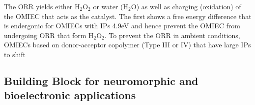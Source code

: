 The ORR yields either H$_{2}$O$_{2}$ or water (H$_{2}$O) as well as charging (oxidation) of the OMIEC that acts as the catalyst. The first shows a free energy difference that is endergonic for OMIECs with IPs \> 4.9eV and hence prevent the OMIEC from undergoing ORR that form H$_{2}$O$_{2}$. To prevent the ORR in ambient conditions, OMIECs based on donor-acceptor copolymer (Type III or IV) that have large IPs to shift
\cite{giovannittiEnergeticControlRedoxActive2020}


\subsection{Building Block for neuromorphic and bioelectronic applications}



